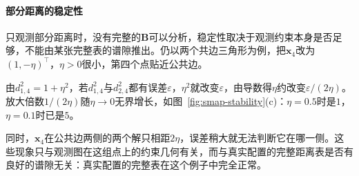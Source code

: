 \paragraph{部分距离的稳定性}

只观测部分距离时，没有完整的$\bm B$可以分析，稳定性取决于观测约束本身是否足够，不能由某张完整表的谱隙推出。仍以两个共边三角形为例，把$\bm x_4$改为$(1,-\eta)^\top$，$\eta>0$很小，第四个点贴近公共边。

由$d_{1,4}^2=1+\eta^2$，若$d_{1,4}^2$与$d_{2,4}^2$都有误差$\varepsilon$，$\eta^2$就改变$\varepsilon$，由导数得$\eta$约改变$\varepsilon/(2\eta)$。放大倍数$1/(2\eta)$随$\eta\to0$无界增长，如图~\ref{fig:smap-stability}(c)：$\eta=0.5$时是$1$，$\eta=0.1$时已是$5$。

同时，$\bm x_4$在公共边两侧的两个解只相距$2\eta$，误差稍大就无法判断它在哪一侧。这些现象只与观测图在这组点上的约束几何有关，而与真实配置的完整距离表是否有良好的谱隙无关：真实配置的完整表在这个例子中完全正常。
